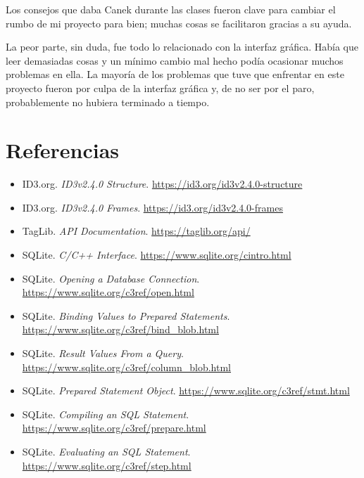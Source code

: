 \documentclass[10pt,a4paper]{article}
\begin{document}
Los consejos que daba Canek durante las clases fueron clave para cambiar el rumbo de mi proyecto para bien; muchas cosas se facilitaron gracias a su ayuda.

La peor parte, sin duda, fue todo lo relacionado con la interfaz gráfica. Había que leer demasiadas cosas y un mínimo cambio mal hecho podía ocasionar muchos problemas en ella. La mayoría de los problemas que tuve que enfrentar en este proyecto fueron por culpa de la interfaz gráfica y, de no ser por el paro, probablemente no hubiera terminado a tiempo.

\section{Referencias}

\footnotesize
\begin{itemize}
    \item ID3.org. \textit{ID3v2.4.0 Structure}.
    \url{https://id3.org/id3v2.4.0-structure}

    \item ID3.org. \textit{ID3v2.4.0 Frames}.
    \url{https://id3.org/id3v2.4.0-frames}

    \item TagLib. \textit{API Documentation}.
    \url{https://taglib.org/api/}

    \item SQLite. \textit{C/C++ Interface}.
    \url{https://www.sqlite.org/cintro.html}

    \item SQLite. \textit{Opening a Database Connection}.
    \url{https://www.sqlite.org/c3ref/open.html}

    \item SQLite. \textit{Binding Values to Prepared Statements}.
    \url{https://www.sqlite.org/c3ref/bind_blob.html}

    \item SQLite. \textit{Result Values From a Query}.
    \url{https://www.sqlite.org/c3ref/column_blob.html}

    \item SQLite. \textit{Prepared Statement Object}.
    \url{https://www.sqlite.org/c3ref/stmt.html}

    \item SQLite. \textit{Compiling an SQL Statement}.
    \url{https://www.sqlite.org/c3ref/prepare.html}

    \item SQLite. \textit{Evaluating an SQL Statement}.
    \url{https://www.sqlite.org/c3ref/step.html}


\end{itemize}
\end{document}
